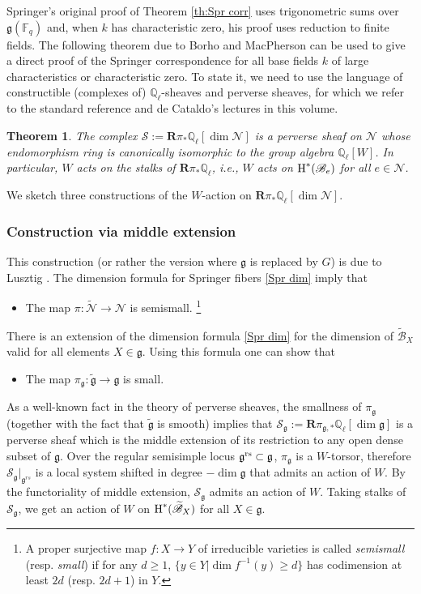 \documentclass[]{pcmi}
\let\oldsubsubsection\subsubsection
\renewcommand{\subsubsection}[1]{%
\setcounter{subsubsection}{\value{equation}}%
\oldsubsubsection{#1}%
\refstepcounter{equation}%
}
\theoremstyle{plain}
\newtheorem{theorem}[equation]{Theorem}
\theoremstyle{definition}
\def\FF{\mathbb{F}}
\def\QQ{\mathbb{Q}}
\def\calS{\mathcal{S}}
\newcommand{\sB}{\ensuremath{\mathscr{B}}\xspace}
\newcommand{\sN}{\ensuremath{\mathscr{N}}\xspace}
\newcommand{\sB}{\ensuremath{\mathcal{B}}\xspace}
\newcommand{\sN}{\ensuremath{\mathcal{N}}\xspace}
\def\bR{\mathbf{R}}
\newcommand\frg{\mathfrak{g}}
\newcommand\rs{\textup{rs}}
\newcommand{\Ql}{\QQ_{\ell}}
\newcommand{\wt}{\widetilde}
\newcommand{\cohog}[2]{\textup{H}^{#1}({#2})}     %
\newcommand{\tN}{\wt{\sN}}
\newcommand{\tB}{\wt{\sB}}
\newcommand{\tg}{\wt{\frg}}
\begin{document}
Springer's original proof of Theorem \ref{th:Spr corr} uses trigonometric sums over $\frg(\FF_{q})$ and, when $k$ has characteristic zero, his proof uses reduction to finite fields. The following theorem due to Borho and MacPherson \cite{BM} can be used to give a direct proof of the Springer correspondence for all base fields $k$ of large characteristics or characteristic zero. To state it, we need to use the language of constructible (complexes of) $\Ql$-sheaves and perverse sheaves, for which we refer to the standard reference \cite{BBD} and de Cataldo's lectures \cite{dC} in this volume. 

\begin{theorem}\label{th:BM} The complex $\calS:=\bR\pi_{*}\Ql[\dim\sN]$ is a perverse sheaf on $\sN$ whose endomorphism ring is canonically isomorphic to the group algebra $\Ql[W]$. In particular, $W$ acts on the stalks of $\bR\pi_{*}\Ql$, i.e., $W$ acts on $\cohog{*}{\sB_{e}}$ for all $e\in\sN$.
\end{theorem}


We sketch three constructions of the $W$-action on $\bR\pi_{*}\Ql[\dim\sN]$.

\subsubsection{Construction via middle extension}\label{sss:mid} This construction (or rather the version where $\frg$ is replaced by $G$) is due to Lusztig \cite[\S3]{LuGreen}. The dimension formula for Springer fibers \eqref{Spr dim} imply that 
\begin{itemize}
\item The map $\pi:\tN\to\sN$ is semismall. \footnote{A proper surjective map $f:X\to Y$ of irreducible varieties is called {\em semismall} (resp. {\em small}) if for any $d\geq 1$, $\{y\in Y|\dim f^{-1}(y)\geq d\}$ has codimension at least $2d$ (resp. $2d+1$) in $Y$.}
\end{itemize}
There is an extension of the dimension formula \eqref{Spr dim} for the dimension of $\tB_{X}$ valid for all elements $X\in \frg$. Using this formula one can show that
\begin{itemize}
\item The map $\pi_{\frg}:\tg\to\frg$ is small.
\end{itemize}
As a well-known fact in the theory of perverse sheaves, the smallness of $\pi_{\frg}$ (together with the fact that $\tg$ is smooth) implies that $\calS_{\frg}:=\bR\pi_{\frg,*}\Ql[\dim\frg]$ is a perverse sheaf which is  the middle extension of its restriction to any open dense subset of $\frg$. Over the regular semisimple locus $\frg^{\rs}\subset \frg$, $\pi_{\frg}$ is a $W$-torsor, therefore $\calS_{\frg}|_{\frg^{rs}}$ is a local system shifted in degree $-\dim\frg$ that admits an action of $W$. By the functoriality of middle extension, $\calS_{\frg}$ admits an action of $W$. Taking stalks of $\calS_{\frg}$, we get an action of $W$ on $\cohog{*}{\tB_{X}}$ for all $X\in\frg$. 
\end{document}
